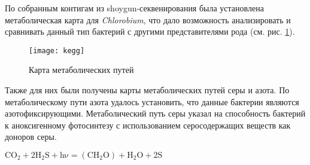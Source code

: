 По собранным контигам из shoygun-секвенирования была установлена метаболическая карта для \textit{Chlorobium}, что дало возможность анализировать и сравнивать данный тип бактерий с другими представителями рода (см. рис. \ref{img:kegg}). 


\begin{figure}[h]
  \texttt{[image: kegg]}
  \centering
  \caption{Карта метаболических путей}
  \label{img:kegg}  
\end{figure}



Также для них были получены карты метаболических путей серы и азота. По метаболическому пути азота удалось установить, что данные бактерии являются азотофиксирующими. Метаболический путь серы указал на способность бактерий к аноксигенному фотосинтезу с использованием серосодержащих веществ как доноров серы. 

\center $\mathrm{C O_2 + 2H_2 S + h\nu = (C H_2 O) + H_2 O + 2 S}$


\clearpage
